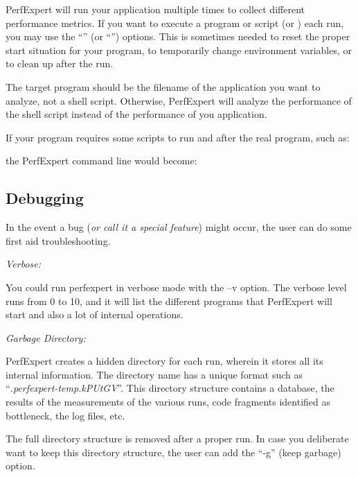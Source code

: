 PerfExpert will run your application multiple times to collect different performance metrics. If you want to execute a program or script  (or ) each run, you may use the ``'' (or ``'') options. This is sometimes needed to reset the proper start situation for your program, to temporarily change environment variables, or to clean up after the run.

The target program should be the filename of the application you want to analyze, not a shell script. Otherwise, PerfExpert will analyze the performance of the shell script instead of the performance of you application.

If your program requires some scripts to run and after the real program, such as:

\begin{prompt}
\end{prompt}

the PerfExpert command line would become:

\begin{prompt}
\end{prompt}

\subsection{Debugging}
\label{subsec:Debugging}

In the event a bug (\textit{or call it a special feature}) might occur, the user can do some first aid troubleshooting.

\emph{Verbose:}

You could run perfexpert in verbose mode with the --v option. The verbose level runs from 0 to 10, and it will list the different programs that PerfExpert will start and also a lot of internal operations.

\emph{Garbage Directory:}

PerfExpert creates a hidden directory for each run, wherein it stores all its internal information. The directory name has a unique format such as ``\textit{.perfexpert-temp.kPUtGV}''. This directory structure contains a database, the results of the measurements of the various runs, code fragments identified as bottleneck, the log files, etc.

The full directory structure is removed after a proper run. In case you deliberate want to keep this directory structure, the user can add the ``-g'' (keep garbage) option.

